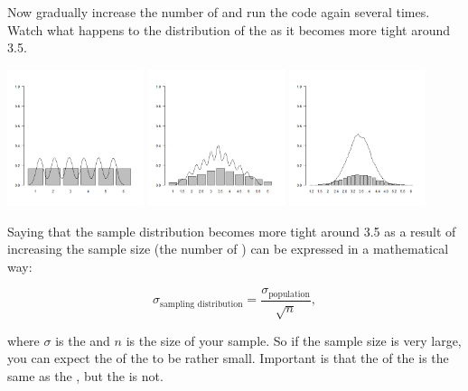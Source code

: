 Now gradually increase the number of  and run the code again several times. Watch what happens to the distribution of the  as it becomes more tight around 3.5. 

\begin{center}
    \includegraphics[width=0.3\textwidth]{Files/Images/clm1.png}
    \includegraphics[width=0.3\textwidth]{Files/Images/clm2.png}
    \includegraphics[width=0.3\textwidth]{Files/Images/clm5.png} \\
     \hspace{3.3cm}  \hspace{3.3cm} 
\end{center}

Saying that the sample distribution becomes more tight around 3.5 as a result of increasing the sample size (the number of ) can be expressed in a mathematical way:

\begin{equation*}
    \sigma_{\text{sampling distribution}} = \frac{\sigma_{\text{population}}}{\sqrt{n}},
\end{equation*}

where $\sigma$ is the  and $n$ is the size of your sample. So if the sample size is very large, you can expect the  of the  to be rather small. Important is that the  of the  is the same as the , but the  is not. 

\clearpage %